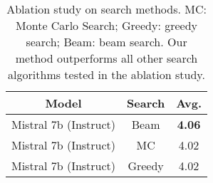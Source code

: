 \begin{table}[!t]
\begin{center}

\begin{tabular}{ c c c  } 
    \toprule
    \textbf{Model} & \textbf{Search} & \textbf{Avg.} \\
    
    \midrule
    Mistral 7b (Instruct) & Beam  & \textbf{4.06} \\
    \midrule
    
    Mistral 7b (Instruct) &  MC  & 4.02 \\
    Mistral 7b (Instruct) & Greedy & 4.02 \\
    
    \bottomrule
    
\end{tabular}

\caption{Ablation study on search methods. MC: Monte Carlo Search; Greedy: greedy search; Beam: beam search. Our method outperforms all other search algorithms tested in the ablation study.}
\vspace{-10pt}
\label{tab:ablation_search_algo}
\end{center}
\end{table}
